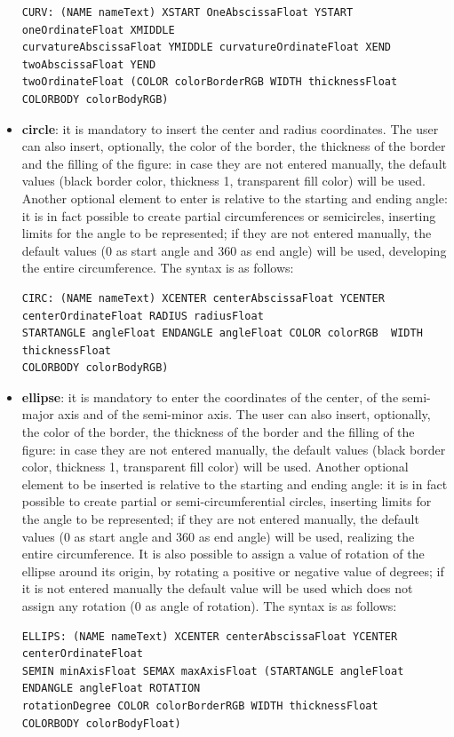 \documentclass[a4paper]{article}
\begin{document}
\begin{itemize}
\vspace{1\baselineskip}
\begin{verbatim}
CURV: (NAME nameText) XSTART OneAbscissaFloat YSTART oneOrdinateFloat XMIDDLE
curvatureAbscissaFloat YMIDDLE curvatureOrdinateFloat XEND twoAbscissaFloat YEND 
twoOrdinateFloat (COLOR colorBorderRGB WIDTH thicknessFloat 
COLORBODY colorBodyRGB)
\end{verbatim}
\vspace{1\baselineskip}
\item \textbf{circle}: 
it is mandatory to insert the center and radius coordinates. The user can also insert, optionally, the color of the border, the thickness of the border and the filling of the figure: in case they are not entered manually, the default values (black border color, thickness 1, transparent fill color) will be used. Another optional element to enter is relative to the starting and ending angle: it is in fact possible to create partial circumferences or semicircles, inserting limits for the angle to be represented; if they are not entered manually, the default values (0 as start angle and 360 as end angle) will be used, developing the entire circumference. The syntax is as follows:
\vspace{1\baselineskip}
\begin{verbatim}
CIRC: (NAME nameText) XCENTER centerAbscissaFloat YCENTER centerOrdinateFloat RADIUS radiusFloat
STARTANGLE angleFloat ENDANGLE angleFloat COLOR colorRGB  WIDTH thicknessFloat 
COLORBODY colorBodyRGB)
\end{verbatim}
\vspace{1\baselineskip}
\item \textbf{ellipse}: it is mandatory to enter the coordinates of the center, of the semi-major axis and of the semi-minor axis. The user can also insert, optionally, the color of the border, the thickness of the border and the filling of the figure: in case they are not entered manually, the default values (black border color, thickness 1, transparent fill color) will be used. Another optional element to be inserted is relative to the starting and ending angle: it is in fact possible to create partial or semi-circumferential circles, inserting limits for the angle to be represented; if they are not entered manually, the default values (0 as start angle and 360 as end angle) will be used, realizing the entire circumference. It is also possible to assign a value of rotation of the ellipse around its origin, by rotating a positive or negative value of degrees; if it is not entered manually the default value will be used which does not assign any rotation (0 as angle of rotation). The syntax is as follows:
\vspace{1\baselineskip}
\begin{verbatim}
ELLIPS: (NAME nameText) XCENTER centerAbscissaFloat YCENTER centerOrdinateFloat 
SEMIN minAxisFloat SEMAX maxAxisFloat (STARTANGLE angleFloat ENDANGLE angleFloat ROTATION
rotationDegree COLOR colorBorderRGB WIDTH thicknessFloat 
COLORBODY colorBodyFloat)
\end{verbatim}
\vspace{1\baselineskip}
\end{itemize}
\end{document}
